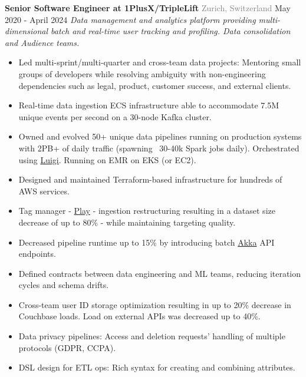 \documentclass{article}
\begin{document}
        
        \begin{flushleft}
            \textbf{\large Senior Software Engineer at 1PlusX/TripleLift} 
            {\footnotesize \textcolor{gray}{Zurich, Switzerland}} \hfill \small May 2020 - April 2024 
            \newline
            \textit{Data management and analytics platform providing multi-dimensional batch and real-time user tracking and profiling. Data consolidation and Audience teams. }
            \begin{itemize}[label=\raisebox{0.25ex}{\tiny$\bullet$}, leftmargin=1.5em, labelsep=0.3em]
                \item Led multi-sprint/multi-quarter and cross-team data projects: Mentoring small groups of developers while resolving ambiguity with non-engineering dependencies such as legal, product, customer success, and external clients.
                \item Real-time data ingestion ECS infrastructure able to accommodate 7.5M unique events per second on a 30-node Kafka cluster.
                \item Owned and evolved 50+ unique data pipelines running on production systems with 2PB+ of daily traffic (spawning ~30-40k Spark jobs daily). Orchestrated using \href{https://github.com/spotify/luigi}{Luigi}. Running on EMR on EKS (or EC2).
                \item Designed and maintained Terraform-based infrastructure for hundreds of AWS services.
                \item Tag manager - \href{https://www.playframework.com/}{Play} - ingestion restructuring resulting in a dataset size decrease of up to 80\% - while maintaining targeting quality.
                \item Decreased pipeline runtime up to 15\% by introducing batch \href{https://github.com/akka/akka-core}{Akka} API endpoints.
                \item Defined contracts between data engineering and ML teams, reducing iteration cycles and schema drifts.
                \item Cross-team user ID storage optimization resulting in up to 20\% decrease in Couchbase loads. Load on external APIs was decreased up to 40\%. 
                \item Data privacy pipelines: Access and deletion requests' handling of multiple protocols (GDPR, CCPA).
            \item DSL design for ETL ops: Rich syntax for creating and combining attributes.

\end{itemize}
\end{flushleft}
\end{document}
